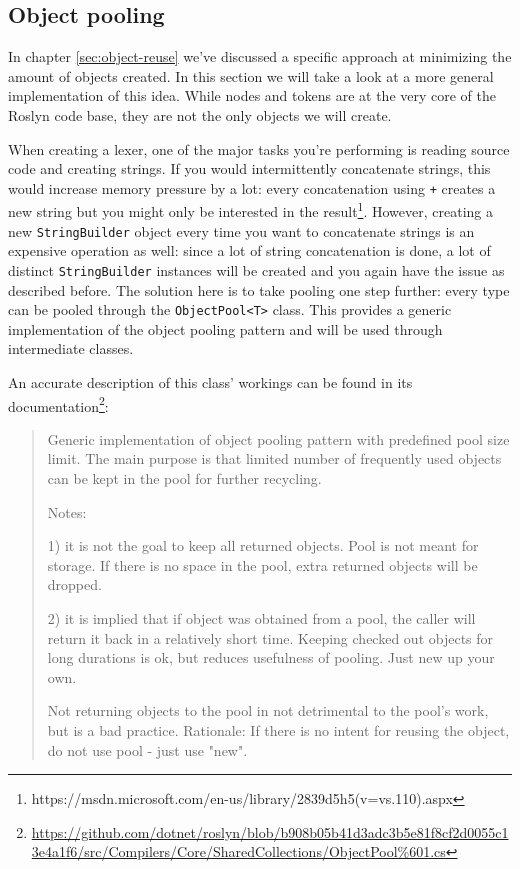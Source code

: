 \subsection{Object pooling}
\label{sec:object-pooling}

In chapter \ref{sec:object-reuse} we've discussed a specific approach at minimizing the amount of objects created. In this section we will take a look at a more general implementation of this idea. While nodes and tokens are at the very core of the Roslyn code base, they are not the only objects we will create. 

When creating a lexer, one of the major tasks you're performing is reading source code and creating strings. If you would intermittently concatenate strings, this would increase memory pressure by a lot: every \gls{concatenation} using \texttt{+} creates a new string but you might only be interested in the result\footnote{https://msdn.microsoft.com/en-us/library/2839d5h5(v=vs.110).aspx}. 
However, creating a new \texttt{StringBuilder} object every time you want to concatenate strings is an expensive operation as well: since a lot of string \gls{concatenation} is done, a lot of distinct \texttt{StringBuilder} instances will be created and you again have the issue as described before. The solution here is to take pooling one step further: every type can be pooled through the \texttt{ObjectPool<T>} class.\parencite{Warren2014} This provides a generic implementation of the object pooling pattern and will be used through intermediate classes.

An accurate description of this class' workings can be found in its documentation\footnote{\url{https://github.com/dotnet/roslyn/blob/b908b05b41d3adc3b5e81f8cf2d0055c13e4a1f6/src/Compilers/Core/SharedCollections/ObjectPool\%601.cs}}:

\begin{quotation}
Generic implementation of object pooling pattern with predefined pool size limit. The main
purpose is that limited number of frequently used objects can be kept in the pool for
further recycling.

Notes: 

1) it is not the goal to keep all returned objects. Pool is not meant for storage. If there
   is no space in the pool, extra returned objects will be dropped.

2) it is implied that if object was obtained from a pool, the caller will return it back in
   a relatively short time. Keeping checked out objects for long durations is ok, but 
   reduces usefulness of pooling. Just new up your own.

Not returning objects to the pool in not detrimental to the pool's work, but is a bad practice. 
Rationale: 
   If there is no intent for reusing the object, do not use pool - just use "new". 
\end{quotation}

